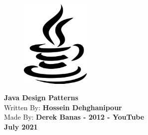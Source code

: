 \documentclass[10pt , a4paper]{article}
\begin{document}
\thispagestyle{empty}
\begin{center}
\begin{figure}[H]
\centering
\includegraphics[width=0.3\textwidth]{javaLogo.png}
\caption*{}
\label{f-0-0}
\end{figure}
\Huge{ \textbf{Java Design Patterns}}\\[20pt]
\large
Written By: \textbf{Hossein Dehghanipour}\\[20pt]
Made By:  \textbf{Derek Banas - 2012 - YouTube}\\[20pt]
\textbf{July 2021}

\end{center}



\newpage
\end{document}
